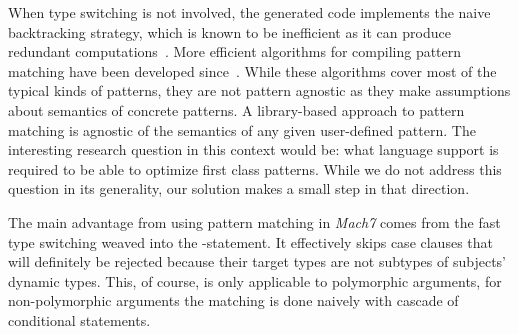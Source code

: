 \noindent
When type switching is not involved, the generated code implements the naive 
backtracking strategy, which is known to be inefficient as it can produce 
redundant computations~\cite[]{Cardelli84}. More efficient 
algorithms for compiling pattern matching have been developed 
since~\cite{Augustsson85,Maranget92,Puel93,OPM01,Maranget08}. While these 
algorithms cover most of the typical kinds of patterns, they are not pattern agnostic 
as they make assumptions about semantics of concrete patterns. A library-based 
approach to pattern matching is agnostic of the semantics of any given 
user-defined pattern. The interesting research question in this context would 
be: what language support is required to be able to optimize first class 
patterns. While we do not address this question in its generality, our solution 
makes a small step in that direction.

The main advantage from using pattern matching in \emph{Mach7} comes from the fast type 
switching weaved into the -statement. It effectively skips case 
clauses that will definitely be rejected because their target types are not 
subtypes of subjects' dynamic types. This, of course, is only applicable to 
polymorphic arguments, for non-polymorphic arguments the matching is done 
naively with cascade of conditional statements.
